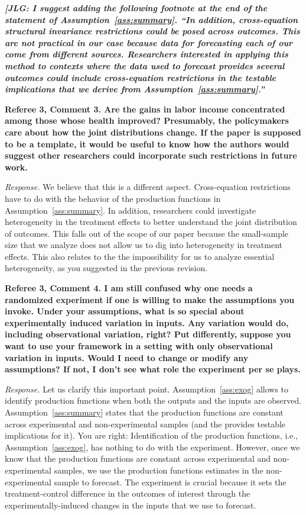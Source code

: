 \textit{\textbf{[JLG: I suggest adding the following footnote at the end of the statement of Assumption~\ref{ass:summary}. ``In addition, cross-equation structural invariance restrictions could be posed across outcomes. This are not practical in our case because data for forecasting each of our come from different sources. Researchers interested in applying this method to contexts where the data used to forecast provides several outcomes could include cross-equation restrictions in the testable implications that we derive from Assumption~\ref{ass:summary}.''}} 

\noindent \textbf{Referee 3, Comment 3. Are the gains in labor income concentrated among those whose health improved? Presumably, the policymakers care about how the joint distributions change. If the paper is supposed to be a template, it would be useful to know how the authors would suggest other researchers could incorporate such restrictions in future work.}

\noindent \textit{Response.} We believe that this is a different aspect. Cross-equation restrictions have to do with the behavior of the production functions in Assumption~\ref{ass:summary}. In addition, researchers could investigate heterogeneity in the treatment effects to better understand the joint distribution of outcomes. This falls out of the scope of our paper because the small-sample size that we analyze does not allow us to dig into heterogeneity in treatment effects. This also relates to the the impossibility for us to analyze essential heterogeneity, as you suggested in the previous revision. 

\noindent \textbf{Referee 3, Comment 4. I am still confused why one needs a randomized experiment if one is willing to make the assumptions you invoke. Under your assumptions, what is so special about experimentally induced variation in inputs. Any variation would do, including observational variation, right? Put differently, suppose you want to use your framework in a setting with only observational variation in inputs. Would I need to change or modify any assumptions? If not, I don't see what role the experiment per se plays.}

\noindent \textit{Response.} Let us clarify this important point. Assumption~\ref{ass:exog} allows to identify production functions when both the outputs and the inputs are observed. Assumption~\ref{ass:summary} states that the production functions are constant across experimental and non-experimental samples (and the provides testable implications for it). You are right: Identification of the production functions, i.e., Assumption~\ref{ass:exog}, has nothing to do with the experiment. However, once we know that the production functions are constant across experimental and non-experimental samples, we use the production functions estimates in the non-experimental sample to forecast. The experiment is crucial because it sets the treatment-control difference in the outcomes of interest through the experimentally-induced changes in the inputs that we use to forecast.

